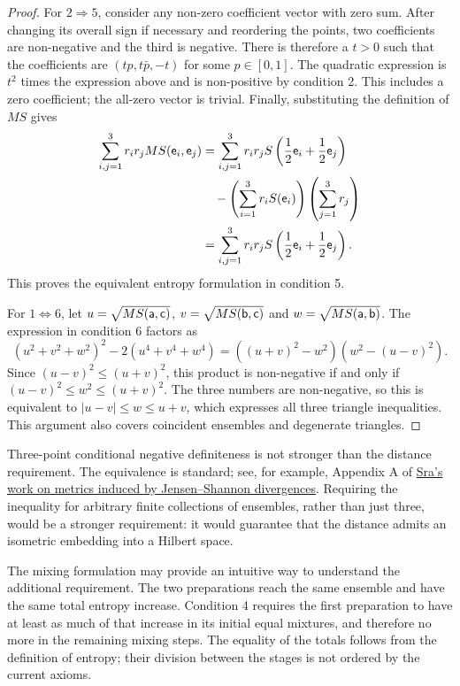 \begin{proof}
	For $2\Rightarrow5$, consider any non-zero coefficient vector with zero sum. After changing its overall sign if necessary and reordering the points, two coefficients are non-negative and the third is negative. There is therefore a $t>0$ such that the coefficients are $(tp,t\bar{p},-t)$ for some $p\in[0,1]$. The quadratic expression is $t^2$ times the expression above and is non-positive by condition 2. This includes a zero coefficient; the all-zero vector is trivial. Finally, substituting the definition of $MS$ gives
	\begin{equation}
		\begin{aligned}
			\sum_{i,j=1}^3 r_i r_j MS(\ens_i,\ens_j)
			&=\sum_{i,j=1}^3 r_i r_j S\left(\frac{1}{2}\ens_i+\frac{1}{2}\ens_j\right)\\
			&\quad-\left(\sum_{i=1}^3 r_i S(\ens_i)\right)\left(\sum_{j=1}^3 r_j\right)\\
			&=\sum_{i,j=1}^3 r_i r_j S\left(\frac{1}{2}\ens_i+\frac{1}{2}\ens_j\right).
		\end{aligned}
	\end{equation}
	This proves the equivalent entropy formulation in condition 5.
	
	For $1\Leftrightarrow6$, let $u=\sqrt{MS(\ens[a],\ens[c])}$, $v=\sqrt{MS(\ens[b],\ens[c])}$ and $w=\sqrt{MS(\ens[a],\ens[b])}$. The expression in condition 6 factors as
	\begin{equation}
		(u^2+v^2+w^2)^2-2(u^4+v^4+w^4)
		=\left((u+v)^2-w^2\right)\left(w^2-(u-v)^2\right).
	\end{equation}
	Since $(u-v)^2\leq(u+v)^2$, this product is non-negative if and only if $(u-v)^2\leq w^2\leq(u+v)^2$. The three numbers are non-negative, so this is equivalent to $|u-v|\leq w\leq u+v$, which expresses all three triangle inequalities. This argument also covers coincident ensembles and degenerate triangles.
\end{proof}

Three-point conditional negative definiteness is not stronger than the distance requirement. The equivalence is standard; see, for example, Appendix A of \href{https://arxiv.org/pdf/1911.02643}{Sra's work on metrics induced by Jensen--Shannon divergences}. Requiring the inequality for arbitrary finite collections of ensembles, rather than just three, would be a stronger requirement: it would guarantee that the distance admits an isometric embedding into a Hilbert space.

The mixing formulation may provide an intuitive way to understand the additional requirement. The two preparations reach the same ensemble and have the same total entropy increase. Condition 4 requires the first preparation to have at least as much of that increase in its initial equal mixtures, and therefore no more in the remaining mixing steps. The equality of the totals follows from the definition of entropy; their division between the stages is not ordered by the current axioms.

